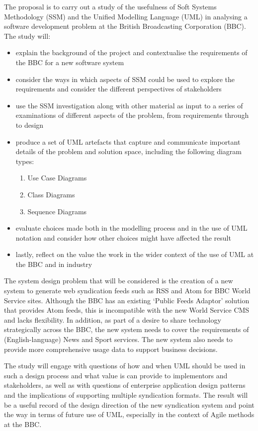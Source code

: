 \documentclass[a4paper]{article}
\begin{document}
The proposal is to carry out a study of the usefulness of Soft Systems Methodology (SSM) and the Unified Modelling Language (UML) in analysing a software development problem at the British Broadcasting Corporation (BBC). The study will:

\begin{itemize}
\item explain the background of the project and contextualise the requirements of the BBC for a new software system
\item consider the ways in which aspects of SSM could be used to explore the requirements and consider the different perspectives of stakeholders
\item use the SSM investigation along with other material as input to a series of examinations of different aspects of the problem, from requirements through to design
\item produce a set of UML artefacts that capture and communicate important details of the problem and solution space, including the following diagram types:
\begin{enumerate}
\item Use Case Diagrams
\item Class Diagrams
\item Sequence Diagrams
\end{enumerate}
\item evaluate choices made both in the modelling process and in the use of UML notation and consider how other choices might have affected the result
\item lastly, reflect on the value the work in the wider context of the use of UML at the BBC and in industry
\end{itemize}

The system design problem that will be considered is the creation of a new system to generate web syndication feeds such as RSS and Atom for BBC World Service sites. Although the BBC has an existing `Public Feeds Adaptor' solution that provides Atom feeds, this is incompatible with the new World Service CMS and lacks flexibility. In addition, as part of a desire to share technology strategically across the BBC, the new system needs to cover the requirements of (English-language) News and Sport services. The new system also needs to provide more comprehensive usage data to support business decisions.

The study will engage with questions of how and when UML should be used in such a design process and what value is can provide to implementors and stakeholders, as well as with questions of enterprise application design patterns and the implications of supporting multiple syndication formats. The result will be a useful record of the design direction of the new syndication system and point the way in terms of future use of UML, especially in the context of Agile methods at the BBC.
\end{document}
